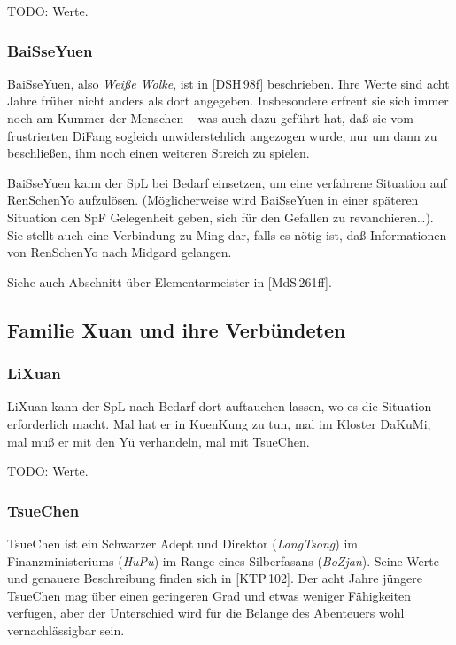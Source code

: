 \documentclass[
a4paper,
twoside,
DIV=calc,
BCOR=4mm,
fontsize=9pt,
twocolumn=on,
titlepage=on,
parskip=half
]{scrartcl}
\begin{document}
TODO: Werte.

\subsubsection{BaiSseYuen}

BaiSseYuen, also \emph{Weiße Wolke}, ist in [DSH\,98f]
beschrieben. Ihre Werte sind acht Jahre früher nicht anders als dort
angegeben. Insbesondere erfreut sie sich immer noch am Kummer der
Menschen -- was auch dazu geführt hat, daß sie vom frustrierten DiFang
sogleich unwiderstehlich angezogen wurde, nur um dann zu beschließen,
ihm noch einen weiteren Streich zu spielen.

BaiSseYuen kann der SpL bei Bedarf einsetzen, um eine verfahrene
Situation auf RenSchenYo aufzulösen. (Möglicherweise wird BaiSseYuen
in einer späteren Situation den SpF Gelegenheit geben, sich für den
Gefallen zu revanchieren\dots). Sie stellt auch eine Verbindung zu
Ming dar, falls es nötig ist, daß Informationen von RenSchenYo nach
Midgard gelangen.

Siehe auch Abschnitt über Elementarmeister in [MdS\,261ff].

\subsection{Familie Xuan und ihre Verbündeten}

\subsubsection{LiXuan}

LiXuan kann der SpL nach Bedarf dort auftauchen lassen, wo es die
Situation erforderlich macht. Mal hat er in KuenKung zu tun, mal im
Kloster DaKuMi, mal muß er mit den Yü verhandeln, mal mit TsueChen.

TODO: Werte.

\subsubsection{TsueChen}

TsueChen ist ein Schwarzer Adept und Direktor (\emph{LangTsong}) im
Finanzministeriums (\emph{HuPu}) im Range eines Silberfasans
(\emph{BoZjan}). Seine Werte und genauere Beschreibung finden sich in
[KTP\,102]. Der acht Jahre jüngere TsueChen mag über einen geringeren
Grad und etwas weniger Fähigkeiten verfügen, aber der Unterschied wird
für die Belange des Abenteuers wohl vernachlässigbar sein.
\end{document}

